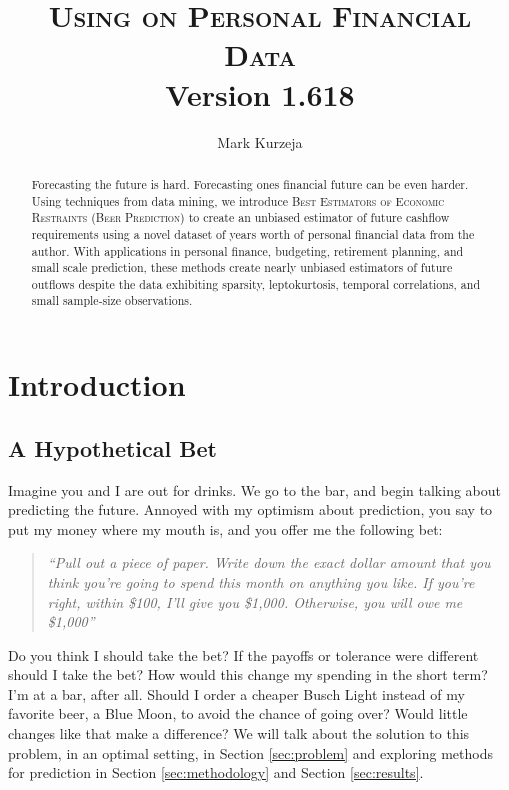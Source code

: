 \documentclass[11pt,a4paper]{article}
\title{\textsc{Using \beer on Personal Financial Data}  \\ {\small \color{harvarddarkgrey} Version 1.618}}
\author{Mark Kurzeja}
\date{}
\newcommand{\beer}{\textsc{Beer Prediction}\xspace}
\begin{document}
\maketitle
\begin{abstract}



Forecasting the future is hard. Forecasting ones financial future can be even harder. Using techniques from data mining, we introduce \textsc{Best Estimators of Economic Restraints} (\beer) to create an unbiased estimator of future cashflow requirements using a novel dataset of years worth of personal financial data from the author. With applications in personal finance, budgeting, retirement planning, and small scale prediction, these methods create nearly unbiased estimators of future outflows despite the data exhibiting sparsity, leptokurtosis, temporal correlations, and small sample-size observations. 

  
\end{abstract}

\section{Introduction} \label{sec:introduction}

\subsection{A Hypothetical Bet}

Imagine you and I are out for drinks. We go to the bar, and begin talking about predicting the future.  Annoyed with my optimism about prediction, you say to put my money where my mouth is, and you offer me the following bet:

\begin{quote}
	\textit{ \color{harvardcrimson}
	``Pull out a piece of paper. Write down the exact dollar amount that you think you're going to spend this month on anything you like. If you're right, within \$100, I'll give you \$1,000. Otherwise, you will owe me \$1,000''
	} 
\end{quote} 

Do you think I should take the bet? If the payoffs or tolerance were different should I take the bet? How would this change my spending in the short term? I'm at a bar, after all. Should I order a cheaper Busch Light instead of my favorite beer, a Blue Moon, to avoid the chance of going over? Would little changes like that make a difference? We will talk about the solution to this problem, in an optimal setting, in Section \ref{sec:problem} and exploring methods for prediction in Section \ref{sec:methodology} and Section \ref{sec:results}.
\end{document}
